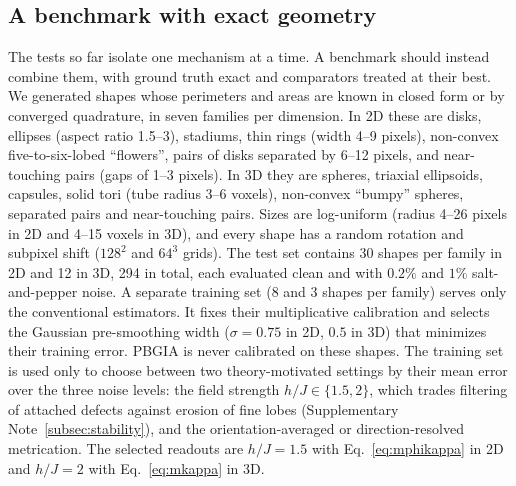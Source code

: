 \documentclass[11pt,a4paper]{article}
\begin{document}
\subsection{A benchmark with exact geometry}\label{subsec:res:bench}
The tests so far isolate one mechanism at a time. A benchmark should instead combine them, with ground truth exact and comparators treated at their best. We generated shapes whose perimeters and areas are known in closed form or by converged quadrature, in seven families per dimension. In 2D these are disks, ellipses (aspect ratio 1.5--3), stadiums, thin rings (width 4--9 pixels), non-convex five-to-six-lobed ``flowers'', pairs of disks separated by 6--12 pixels, and near-touching pairs (gaps of 1--3 pixels). In 3D they are spheres, triaxial ellipsoids, capsules, solid tori (tube radius 3--6 voxels), non-convex ``bumpy'' spheres, separated pairs and near-touching pairs. Sizes are log-uniform (radius 4--26 pixels in 2D and 4--15 voxels in 3D), and every shape has a random rotation and subpixel shift ($128^2$ and $64^3$ grids). The test set contains 30 shapes per family in 2D and 12 in 3D, 294 in total, each evaluated clean and with $0.2\%$ and $1\%$ salt-and-pepper noise. A separate training set (8 and 3 shapes per family) serves only the conventional estimators. It fixes their multiplicative calibration and selects the Gaussian pre-smoothing width ($\sigma=0.75$ in 2D, $0.5$ in 3D) that minimizes their training error. PBGIA is never calibrated on these shapes. The training set is used only to choose between two theory-motivated settings by their mean error over the three noise levels: the field strength $h/J\in\{1.5,2\}$, which trades filtering of attached defects against erosion of fine lobes (Supplementary Note~\ref{subsec:stability}), and the orientation-averaged or direction-resolved metrication. The selected readouts are $h/J=1.5$ with Eq.~\eqref{eq:mphikappa} in 2D and $h/J=2$ with Eq.~\eqref{eq:mkappa} in 3D.
\end{document}
